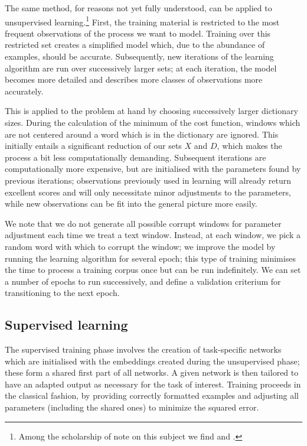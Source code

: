 The same method, for reasons not yet fully understood, can be applied
to unsupervised learning.\footnote{Among the scholarship of note on
  this subject we find \citet{bengio2009curriculum} and
  \citet{erhan2010}.} First, the training material is restricted to the
most frequent observations of the process we want to model. Training
over this restricted set creates a simplified model which, due to the
abundance of examples, should be accurate. Subsequently, new
iterations of the learning algorithm are run over successively larger
sets; at each iteration, the model becomes more detailed and describes
more classes of observations more accurately.

This is applied to the problem at hand by choosing
successively larger dictionary sizes. During the calculation of the
minimum of the cost function, windows which are not centered around a
word which is in the dictionary are ignored. This initially entails a
significant reduction of our sets $X$ and $D$, which makes the process
a bit less computationally demanding. Subsequent iterations are
computationally more expensive, but are initialised with the
parameters found by previous iterations; observations previously used
in learning will already return excellent scores and will only
necessitate minor adjustments to the parameters, while new
observations can be fit into the general picture more easily.

We note that we do not generate all possible corrupt windows for
parameter adjustment each time we treat a text window. Instead, at
each window, we pick a random word with which to corrupt the window;
we improve the model by running the learning algorithm for several
epoch; this type of training minimises the time to process a training
corpus once but can be run indefinitely. We can set a number of epochs
to run successively, and define a validation criterium for
transitioning to the next epoch.

\subsection{Supervised learning}
\label{sec:supervised}

The supervised training phase involves the creation of task-specific
networks which are initialised with the embeddings created during the
unsupervised phase; these form a shared first part of all networks. A
given network is then tailored to have an adapted output as necessary
for the task of interest. Training proceeds in the classical fashion,
by providing correctly formatted examples and adjusting all parameters
(including the shared ones) to minimize the squared error.


